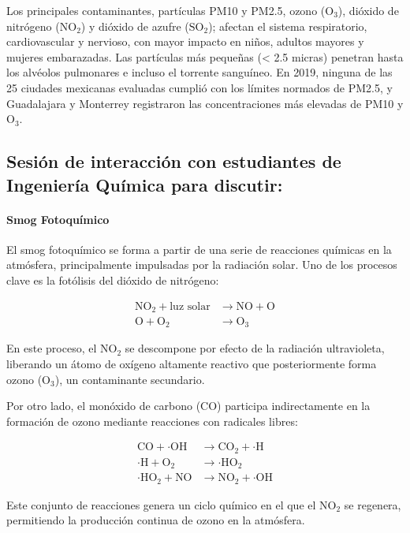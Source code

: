 \documentclass{article}
\begin{document}
    Los principales contaminantes, partículas PM10 y PM2.5, ozono ($\text{O}_3$), dióxido de nitrógeno ($\text{NO}_2$) y dióxido de azufre ($\text{SO}_2$); afectan 
    el sistema respiratorio, cardiovascular y nervioso, con mayor impacto en niños, adultos mayores y mujeres embarazadas. Las partículas más pequeñas (< 2.5 micras) 
    penetran hasta los alvéolos pulmonares e incluso el torrente sanguíneo. En 2019, ninguna de las 25 ciudades mexicanas evaluadas cumplió con los límites normados 
    de PM2.5, y Guadalajara y Monterrey registraron las concentraciones más elevadas de PM10 y $\text{O}_3$.


\subsection{Sesión de interacción con estudiantes de Ingeniería Química para discutir:}
    \paragraph{Smog Fotoquímico}
    El smog fotoquímico se forma a partir de una serie de reacciones químicas en la atmósfera, principalmente impulsadas por la radiación solar. Uno de los procesos clave es la fotólisis del dióxido de nitrógeno:
    
    \begin{align*}
    \text{NO}_2 + \text{luz solar} &\rightarrow \text{NO} + \text{O} \\
    \text{O} + \text{O}_2 &\rightarrow \text{O}_3
    \end{align*}
    
    En este proceso, el NO$_2$ se descompone por efecto de la radiación ultravioleta, liberando un átomo de oxígeno altamente reactivo que posteriormente forma ozono (O$_3$), un contaminante secundario.
    
    Por otro lado, el monóxido de carbono (CO) participa indirectamente en la formación de ozono mediante reacciones con radicales libres:
    
    \begin{align*}
    \text{CO} + \cdot\text{OH} &\rightarrow \text{CO}_2 + \cdot\text{H} \\
    \cdot\text{H} + \text{O}_2 &\rightarrow \cdot\text{HO}_2 \\
    \cdot\text{HO}_2 + \text{NO} &\rightarrow \text{NO}_2 + \cdot\text{OH}
    \end{align*}
    
    Este conjunto de reacciones genera un ciclo químico en el que el NO$_2$ se regenera, permitiendo la producción continua de ozono en la atmósfera.
    
\end{document}
